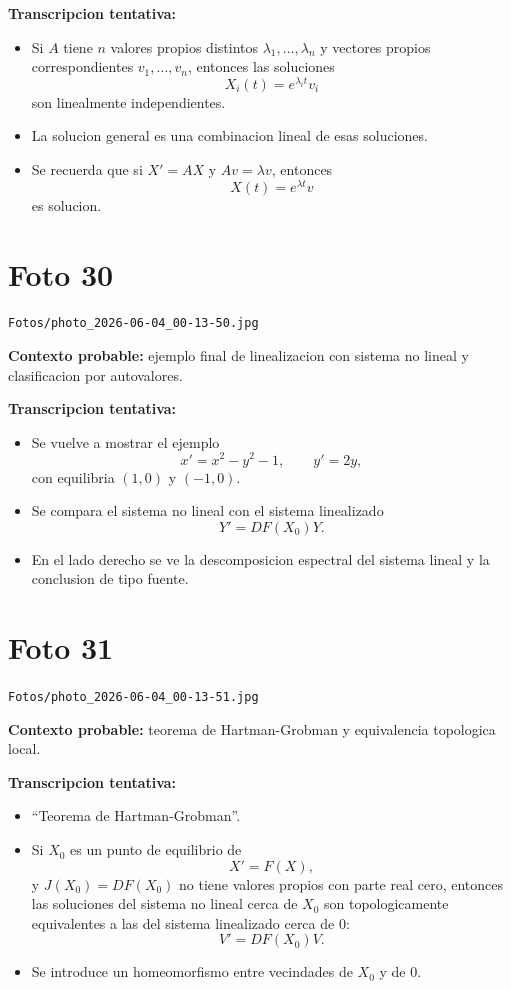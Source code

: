 \documentclass[11pt,letterpaper]{article}
\begin{document}
\textbf{Transcripcion tentativa:}
\begin{itemize}[leftmargin=*]
    \item Si \(A\) tiene \(n\) valores propios distintos \(\lambda_1,\dots,\lambda_n\) y vectores propios correspondientes \(v_1,\dots,v_n\), entonces las soluciones
    \[
    X_i(t)=e^{\lambda_i t}v_i
    \]
    son linealmente independientes.
    \item La solucion general es una combinacion lineal de esas soluciones.
    \item Se recuerda que si \(X'=AX\) y \(A v=\lambda v\), entonces
    \[
    X(t)=e^{\lambda t}v
    \]
    es solucion.
\end{itemize}

\section*{Foto 30}
\texttt{Fotos/photo\_2026-06-04\_00-13-50.jpg}

\textbf{Contexto probable:} ejemplo final de linealizacion con sistema no lineal y clasificacion por autovalores.

\textbf{Transcripcion tentativa:}
\begin{itemize}[leftmargin=*]
    \item Se vuelve a mostrar el ejemplo
    \[
    x'=x^2-y^2-1,\qquad y'=2y,
    \]
    con equilibria \((1,0)\) y \((-1,0)\).
    \item Se compara el sistema no lineal con el sistema linealizado
    \[
    Y'=DF(X_0)Y.
    \]
    \item En el lado derecho se ve la descomposicion espectral del sistema lineal y la conclusion de tipo fuente.
\end{itemize}

\section*{Foto 31}
\texttt{Fotos/photo\_2026-06-04\_00-13-51.jpg}

\textbf{Contexto probable:} teorema de Hartman-Grobman y equivalencia topologica local.

\textbf{Transcripcion tentativa:}
\begin{itemize}[leftmargin=*]
    \item ``Teorema de Hartman-Grobman''.
    \item Si \(X_0\) es un punto de equilibrio de
    \[
    X'=F(X),
    \]
    y \(J(X_0)=DF(X_0)\) no tiene valores propios con parte real cero, entonces las soluciones del sistema no lineal cerca de \(X_0\) son topologicamente equivalentes a las del sistema linealizado cerca de \(0\):
    \[
    V'=DF(X_0)V.
    \]
    \item Se introduce un homeomorfismo entre vecindades de \(X_0\) y de \(0\).
\end{itemize}
\end{document}
